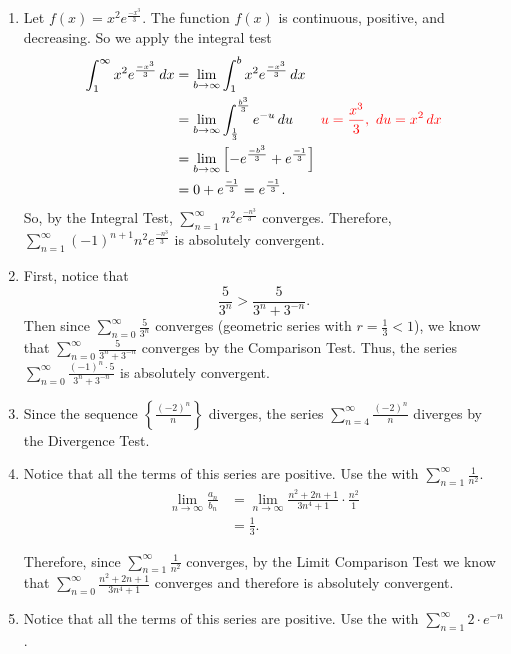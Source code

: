 \documentclass[handout]{ximera}
\begin{document}
\begin{problem}
\begin{freeResponse}
\begin{enumerate}
	\item  Let $f(x) = x^2 e^{\frac{-x^3}{3}}$.  
	The function $f(x)$ is continuous, positive, and decreasing.  
	So we apply the integral test
		\begin{align*}
		\int_1^\infty x^2 e^{\frac{-x^3}{3}} \,d x
		&= \lim_{b \to \infty} \int_1^b x^2 e^{\frac{-x^3}{3}} \,d x  \\
		&= \lim_{b \to \infty} \int_{\frac{1}{3}}^{\frac{b^3}{3}} e^{-u} \,d u \qquad {\color{red}u=\frac{x^3}{3}, \, \,du = x^2 \,dx}  \\
		&= \lim_{b \to \infty} \left[ -e^{\frac{-b^3}{3}} + e^{\frac{-1}{3}} \right]  \\
		&= 0 + e^{\frac{-1}{3}} = e^{\frac{-1}{3}}.
		\end{align*}
	So, by the Integral Test, $\sum_{n=1}^\infty n^2 e^{\frac{-n^3}{3}}$ converges.  
	Therefore, $\sum_{n=1}^\infty (-1)^{n+1} n^2 e^{\frac{-n^3}{3}}$ is {\color{red}absolutely convergent}.
	
	\item  First, notice that
		\[
		\frac{5}{3^n} > \frac{5}{3^n + 3^{-n}}.
		\]
	Then since $\sum_{n=0}^\infty \frac{5}{3^n}$ converges (geometric series with $r = \frac{1}{3} < 1$), we know that 
	$\sum_{n=0}^\infty \frac{5}{3^n + 3^{-n}}$ converges by the Comparison Test.  
	Thus, the series $\sum_{n=0}^\infty \frac{(-1)^n \cdot 5}{3^n + 3^{-n}}$ is {\color{red}absolutely convergent}.
	
	\item  Since the sequence $\left\{ \frac{(-2)^n}{n} \right\}$ diverges, the series $\sum_{n=4}^\infty \frac{(-2)^n}{n}$ {\color{red}diverges} by the Divergence Test.
	
		\item  Notice that all the terms of this series are positive.  Use the  with $\sum_{n=1}^\infty \frac{1}{n^2}$.
			\begin{align*}
			\lim_{n \to \infty} \frac{a_n}{b_n}
			&= \lim_{n \to \infty} \frac{n^2+2n+1}{3n^4+1} \cdot \frac{n^2}{1}  \\
			&= \frac{1}{3}.
			\end{align*}
			
		Therefore, since $\sum_{n=1}^\infty \frac{1}{n^2}$ converges, by the Limit Comparison Test we know that $\sum_{n=0}^\infty \frac{n^2+2n+1}{3n^4+1}$ converges and therefore is {\color{red}absolutely convergent}.
		
	
		
		\item  Notice that all the terms of this series are positive. Use the  with $\sum_{n=1}^\infty 2 \cdot e^{-n}$.
		

\end{enumerate}
\end{freeResponse}
\end{problem}
\end{document}
